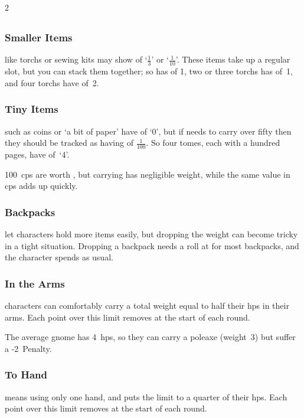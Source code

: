\begin{multicols}{2}
\subsection{}

\subsubsection{Smaller Items}
like \glspl{torch} or sewing kits may show  of `$\frac{1}{3}$' or `$\frac{1}{10}$'.
These items take up a regular slot, but you can stack them together; so  has  of 1, two or three \glspl{torch} has  of~1, and four \glspl{torch} have  of~2.

\subsubsection{Tiny Items}
such as \glspl{coin} or `a bit of paper' have  of `0', but if  needs to carry over fifty then they should be tracked as having  of $\frac{1}{100}$.
So four tomes, each with a hundred pages, have  of~`4'.

100~\glspl{cp} are worth , but carrying  has negligible weight, while the same value in \glspl{cp} adds up quickly.

\subsubsection{Backpacks}
let characters hold more items easily, but dropping the \gls{weight} can become tricky in a tight situation.
Dropping a backpack needs a  roll at \tn[6] for most backpacks, and the character spends  as usual.

\subsubsection{In the Arms}
\label{carryWeight}
characters can comfortably carry a total \gls{weight} equal to half their \glspl{hp} in their arms.
Each point over this limit removes  at the start of each \gls{round}.

The average gnome has 4~\glspl{hp}, so they can carry a poleaxe (\gls{weight}~3) but suffer a -2~Penalty.

\subsubsection{To Hand}
\label{oneHandedWeight}
means using only one hand, and puts the limit to a quarter of their \glspl{hp}.
Each point over this limit removes  at the start of each \gls{round}.


\end{multicols}
